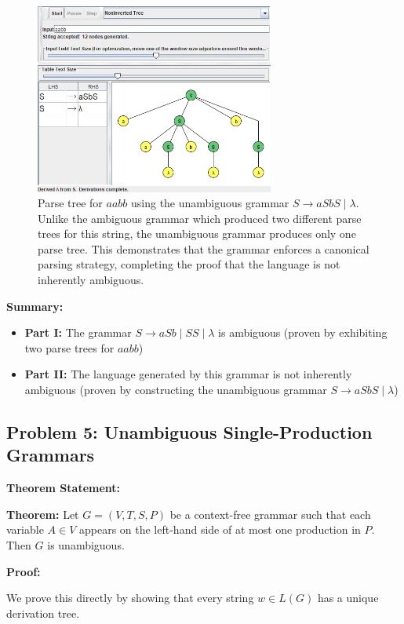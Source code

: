 \documentclass[12pt]{article}
\begin{document}
\begin{figure}[H]
\centering
\includegraphics[width=0.7\textwidth]{Problem 4/Unambiguous Grammar-Tree.png}
\caption{Parse tree for $aabb$ using the unambiguous grammar $S \rightarrow aSbS \mid \lambda$. Unlike the ambiguous grammar which produced two different parse trees for this string, the unambiguous grammar produces only one parse tree. This demonstrates that the grammar enforces a canonical parsing strategy, completing the proof that the language is not inherently ambiguous.}
\label{fig:problem4_unambiguous_tree}
\end{figure}

\textbf{Summary:}
\begin{itemize}
\item \textbf{Part I:} The grammar $S \rightarrow aSb \mid SS \mid \lambda$ is ambiguous (proven by exhibiting two parse trees for $aabb$)
\item \textbf{Part II:} The language generated by this grammar is not inherently ambiguous (proven by constructing the unambiguous grammar $S \rightarrow aSbS \mid \lambda$)
\end{itemize}

\subsection{Problem 5: Unambiguous Single-Production Grammars}

\textbf{Theorem Statement:}

\textbf{Theorem:} Let $G = (V, T, S, P)$ be a context-free grammar such that each variable $A \in V$ appears on the left-hand side of at most one production in $P$. Then $G$ is unambiguous.

\textbf{Proof:}

We prove this directly by showing that every string $w \in L(G)$ has a unique derivation tree.
\end{document}
